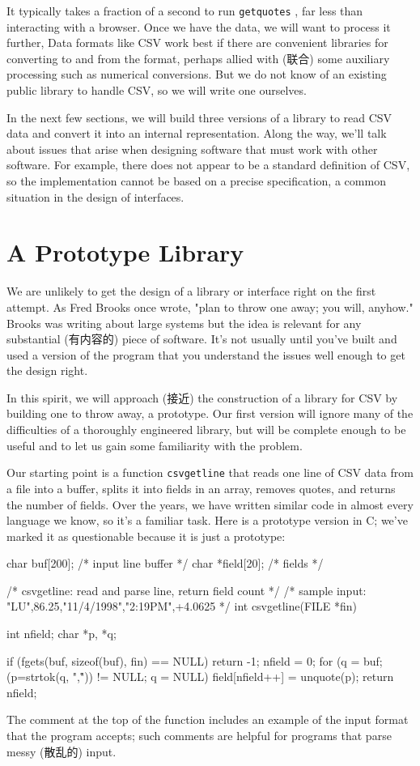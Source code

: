 It typically takes a fraction of a second to run \verb'getquotes' , far
less than interacting with a browser. Once we have the data, we will want
to process it further, Data formats like CSV work best if there are
convenient libraries for converting to and from the format, perhaps allied
with (联合) some auxiliary processing such as numerical conversions. But we
do not know of an existing public library to handle CSV, so we will write
one ourselves.

In the next few sections, we will build three versions of a library to read
CSV data and convert it into an internal representation. Along the way,
we'll talk about issues that arise when designing software that must work
with other software. For example, there does not appear to be a standard
definition of CSV, so the implementation cannot be based on a precise
specification, a common situation in the design of interfaces.

\section{A Prototype Library}
\label{sec:a_prototype_library}

We are unlikely to get the design of a library or interface right on the
first attempt.  As Fred Brooks once wrote, "plan to throw one away; you
will, anyhow." Brooks was writing about large systems but the idea is
relevant for any substantial (有内容的) piece of software. It's not usually
until you've built and used a version of the program that you understand
the issues well enough to get the design right.

In this spirit, we will approach (接近) the construction of a library for
CSV by building one to throw away, a prototype. Our first version will
ignore many of the difficulties of a thoroughly engineered library, but
will be complete enough to be useful and to let us gain some familiarity
with the problem.

Our starting point is a function \verb'csvgetline' that reads one line of
CSV data from a file into a buffer, splits it into fields in an array,
removes quotes, and returns the number of fields. Over the years, we have
written similar code in almost every language we know, so it's a familiar
task. Here is a prototype version in C; we've marked it as questionable
because it is just a prototype:
\begin{badcode}
    char    buf[200];   /* input line buffer */
    char    *field[20]; /* fields */

    /* csvgetline: read and parse line, return field count */
    /* sample input: "LU",86.25,"11/4/1998","2:19PM",+4.0625 */
    int csvgetline(FILE *fin)
    {
        int     nfield;
        char    *p, *q;

        if (fgets(buf, sizeof(buf), fin) == NULL)
            return -1;
        nfield = 0;
        for (q = buf; (p=strtok(q, ",\n\r")) != NULL; q = NULL)
            field[nfield++] = unquote(p);
        return nfield;
    }
\end{badcode}
The comment at the top of the function includes an example of the input
format that the program accepts; such comments are helpful for programs
that parse messy (散乱的) input.

